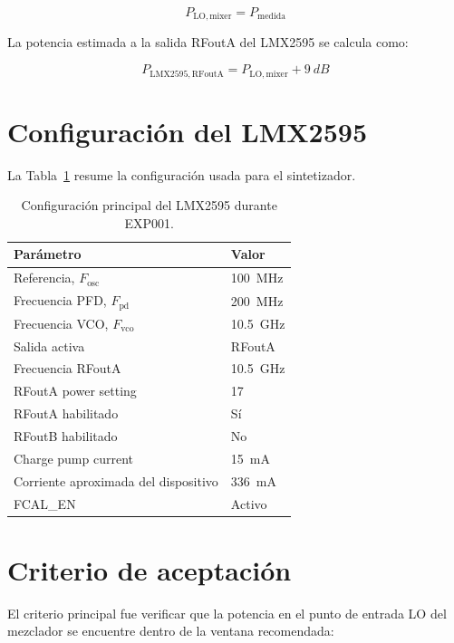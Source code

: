 \documentclass[12pt,a4paper]{article}
\begin{document}
\begin{equation}
P_{\mathrm{LO,mixer}} = P_{\mathrm{medida}}
\end{equation}

La potencia estimada a la salida RFoutA del LMX2595 se calcula como:

\begin{equation}
P_{\mathrm{LMX2595,RFoutA}} = P_{\mathrm{LO,mixer}} + \SI{9}{dB}
\end{equation}

\section{Configuración del LMX2595}

La Tabla~\ref{tab:lmx_config} resume la configuración usada para el sintetizador.

\begin{table}[H]
\centering
\caption{Configuración principal del LMX2595 durante EXP001.}
\label{tab:lmx_config}
\begin{tabular}{ll}
\toprule
\textbf{Parámetro} & \textbf{Valor} \\
\midrule
Referencia, $F_{\mathrm{osc}}$ & \SI{100}{MHz} \\
Frecuencia PFD, $F_{\mathrm{pd}}$ & \SI{200}{MHz} \\
Frecuencia VCO, $F_{\mathrm{vco}}$ & \SI{10.5}{GHz} \\
Salida activa & RFoutA \\
Frecuencia RFoutA & \SI{10.5}{GHz} \\
RFoutA power setting & 17 \\
RFoutA habilitado & Sí \\
RFoutB habilitado & No \\
Charge pump current & \SI{15}{mA} \\
Corriente aproximada del dispositivo & \SI{336}{mA} \\
FCAL\_EN & Activo \\
\bottomrule
\end{tabular}
\end{table}

\section{Criterio de aceptación}

El criterio principal fue verificar que la potencia en el punto de entrada LO del mezclador se encuentre dentro de la ventana recomendada:
\end{document}
